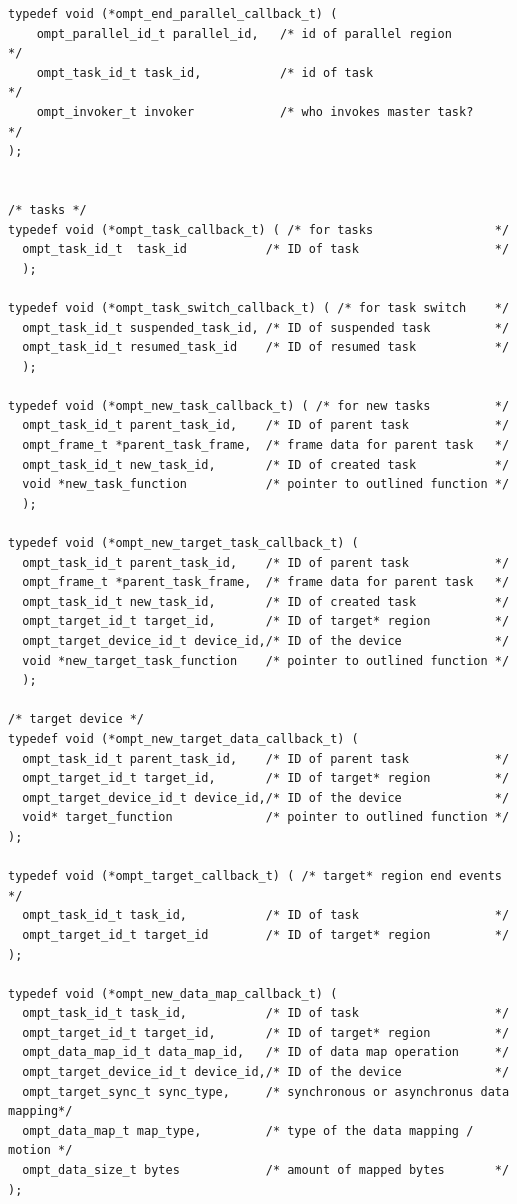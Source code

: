 \documentclass{article}
\begin{document}
\begin{verbatim}
typedef void (*ompt_end_parallel_callback_t) (
    ompt_parallel_id_t parallel_id,   /* id of parallel region       */
    ompt_task_id_t task_id,           /* id of task                  */
    ompt_invoker_t invoker            /* who invokes master task?    */
);
								    
		
/* tasks */						    						    
typedef void (*ompt_task_callback_t) ( /* for tasks                 */	   
  ompt_task_id_t  task_id           /* ID of task                   */
  );

typedef void (*ompt_task_switch_callback_t) ( /* for task switch    */			   
  ompt_task_id_t suspended_task_id, /* ID of suspended task         */ 
  ompt_task_id_t resumed_task_id    /* ID of resumed task           */
  );								   

typedef void (*ompt_new_task_callback_t) ( /* for new tasks         */
  ompt_task_id_t parent_task_id,    /* ID of parent task            */
  ompt_frame_t *parent_task_frame,  /* frame data for parent task   */
  ompt_task_id_t new_task_id,       /* ID of created task           */
  void *new_task_function           /* pointer to outlined function */
  );
  
typedef void (*ompt_new_target_task_callback_t) (
  ompt_task_id_t parent_task_id,    /* ID of parent task            */
  ompt_frame_t *parent_task_frame,  /* frame data for parent task   */
  ompt_task_id_t new_task_id,       /* ID of created task           */
  ompt_target_id_t target_id,       /* ID of target* region         */
  ompt_target_device_id_t device_id,/* ID of the device             */
  void *new_target_task_function    /* pointer to outlined function */
  );

/* target device */
typedef void (*ompt_new_target_data_callback_t) ( 
  ompt_task_id_t parent_task_id,    /* ID of parent task            */
  ompt_target_id_t target_id,       /* ID of target* region         */
  ompt_target_device_id_t device_id,/* ID of the device             */
  void* target_function             /* pointer to outlined function */
);

typedef void (*ompt_target_callback_t) ( /* target* region end events */
  ompt_task_id_t task_id,           /* ID of task                   */
  ompt_target_id_t target_id        /* ID of target* region         */
);

typedef void (*ompt_new_data_map_callback_t) (
  ompt_task_id_t task_id,           /* ID of task                   */
  ompt_target_id_t target_id,       /* ID of target* region         */
  ompt_data_map_id_t data_map_id,   /* ID of data map operation     */
  ompt_target_device_id_t device_id,/* ID of the device             */
  ompt_target_sync_t sync_type,     /* synchronous or asynchronus data mapping*/
  ompt_data_map_t map_type,         /* type of the data mapping / motion */
  ompt_data_size_t bytes            /* amount of mapped bytes       */
);


\end{verbatim}
\end{document}
